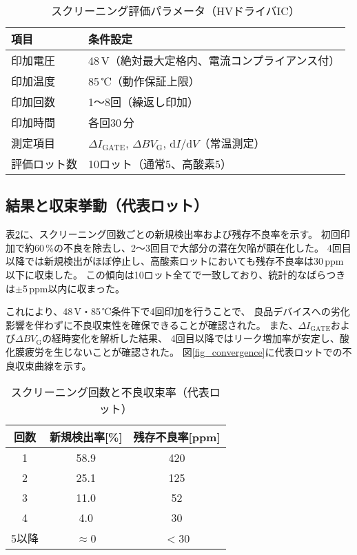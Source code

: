 \documentclass[twocolumn]{ieeetran}
\begin{document}
\begin{table}[t]
\centering
\caption{スクリーニング評価パラメータ（HVドライバIC）}
\label{tab_param}
\begin{tabular}{ll}
\toprule
項目 & 条件設定 \\
\midrule
印加電圧 & 48\,V（絶対最大定格内、電流コンプライアンス付） \\
印加温度 & 85\,℃（動作保証上限） \\
印加回数 & 1～8回（繰返し印加） \\
印加時間 & 各回30\,分 \\
測定項目 & $\Delta I_\mathrm{GATE}$, $\Delta BV_\mathrm{G}$, d$I$/d$V$（常温測定） \\
評価ロット数 & 10ロット（通常5、高酸素5） \\
\bottomrule
\end{tabular}
\end{table}

\subsection{結果と収束挙動（代表ロット）}

表\ref{tab_results}に、スクリーニング回数ごとの新規検出率および残存不良率を示す。
初回印加で約60\,\%の不良を除去し、2～3回目で大部分の潜在欠陥が顕在化した。
4回目以降では新規検出がほぼ停止し、高酸素ロットにおいても残存不良率は30\,ppm以下に収束した。
この傾向は10ロット全てで一致しており、統計的なばらつきは$\pm$5\,ppm以内に収まった。

これにより、48\,V・85\,℃条件下で4回印加を行うことで、
良品デバイスへの劣化影響を伴わずに不良収束性を確保できることが確認された。
また、$\Delta I_\mathrm{GATE}$および$\Delta BV_\mathrm{G}$の経時変化を解析した結果、
4回目以降ではリーク増加率が安定し、酸化膜疲労を生じないことが確認された。
図\ref{fig_convergence}に代表ロットでの不良収束曲線を示す。

\begin{table}[t]
\centering
\caption{スクリーニング回数と不良収束率（代表ロット）}
\label{tab_results}
\begin{tabular}{ccc}
\toprule
回数 & 新規検出率[\%] & 残存不良率[ppm] \\
\midrule
1 & 58.9 & 420 \\
2 & 25.1 & 125 \\
3 & 11.0 & 52 \\
4 & 4.0  & 30 \\
5以降 & $\approx$0 & $<$30 \\
\bottomrule
\end{tabular}
\end{table}
\end{document}
